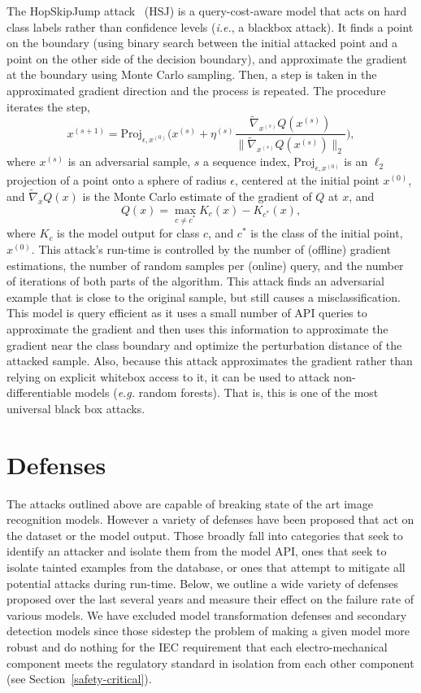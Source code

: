 \documentclass[lettersize,journal]{IEEEtran}
\newcommand{\ie}{\textit{i.e.}\xspace}
\newcommand{\eg}{\textit{e.g.}\xspace}
\begin{document}
The HopSkipJump attack~\cite{hopskipjump} (HSJ) is a query-cost-aware model that acts on hard class labels rather than confidence levels (\ie, a blackbox attack). It finds a point on the boundary (using binary search between the initial attacked point and a point on the other side of the decision boundary), and approximate the gradient at the boundary using Monte Carlo sampling. Then, a step is taken in the approximated gradient direction and the process is repeated. The procedure iterates the step,
$$
   x^{(s+1)} = \mathrm{Proj}_{\epsilon,x^{(0)}}\Bigg( x^{(s)} + \eta^{(s)} \frac{\widetilde{\nabla}_{x^{(s)}}  Q(x^{(s)}) }{\big\|\widetilde{\nabla}_{x^{(s)}} Q(x^{(s)}) \big\|_2}\Bigg),
$$
where $x^{(s)}$ is an adversarial sample, $s$ a sequence index, $\mathrm{Proj}_{\epsilon,x^{(0)}}$ is an $\ell_2$ projection of a point onto a sphere of radius $\epsilon$, centered at the initial point $x^{(0)}$, and $\widetilde{\nabla}_xQ(x)$ is the Monte Carlo estimate of the gradient of $Q$ at $x$, and
$$
    Q(x) = \max_{c\neq c^*} K_c(x) - K_{c^*}(x),
$$
where $K_{c}$ is the model output for class $c$, and $c^*$ is the class of the initial point, $x^{(0)}$. This attack's run-time is controlled by the number of (offline) gradient estimations, the number of random samples per (online) query, and the number of iterations of both parts of the algorithm. This attack finds an adversarial example that is close to the original sample, but still causes a misclassification.  This model is query efficient as it uses a small number of API queries to approximate the gradient and then uses this information to approximate the gradient near the class boundary and optimize the perturbation distance of the attacked sample. Also, because this attack approximates the gradient rather than relying on explicit whitebox access to it, it can be used to attack non-differentiable models (\eg random forests). That is, this is one of the most universal black box attacks.

\section{Defenses}
\label{defenses}

The attacks outlined above are capable of breaking state of the art image recognition models.  However a variety of defenses have been proposed that act on the dataset or the model output. Those broadly fall into categories that seek to identify an attacker and isolate them from the model API, ones that seek to isolate tainted examples from the database, or ones that attempt to mitigate all potential attacks during run-time. Below, we outline a wide variety of defenses proposed over the last several years and measure their effect on the failure rate of various models. We have excluded model transformation defenses and secondary detection models since those sidestep the problem of making a given model more robust and do nothing for the IEC requirement that each electro-mechanical component meets the regulatory standard in isolation from each other component (see Section~\ref{safety-critical}). 
\end{document}
